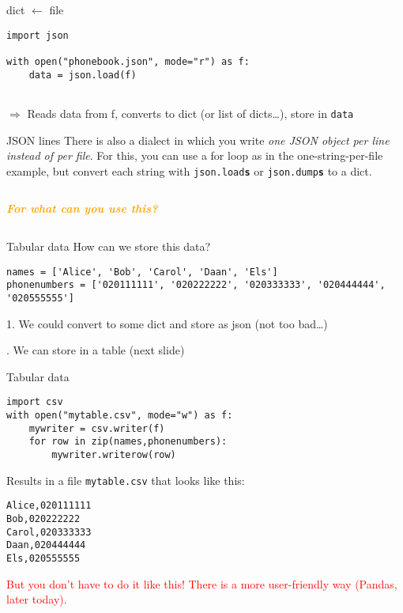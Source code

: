 \documentclass[compress]{beamer}
\newcommand{\question}[1]{
	\begin{frame}[plain]
		\begin{columns}
			\column{.3\textwidth}
			\makebox[\columnwidth]{
				\texttt{[image: mannetje.png]}}
			\column{.7\textwidth}
			\large
			\textcolor{orange}{\textbf{\emph{#1}}}
		\end{columns}
\end{frame}}
\begin{document}
\begin{frame}[fragile]{dict $\leftarrow$ file}
\begin{lstlisting}
import json

with open("phonebook.json", mode="r") as f:
	data = json.load(f)
	
\end{lstlisting}

$\Rightarrow$ Reads data from f, converts to dict (or list of dicts\ldots), store in \texttt{data}

\pause

\small
\begin{alertblock}{JSON lines}
There is also a dialect in which you write \emph{one JSON object per line instead of per file}. For this, you can use a for loop as in the one-string-per-file example, but convert each string with  \texttt{json.load\textbf{s}} or \texttt{json.dump\textbf{s}} to a dict.
\end{alertblock}


\end{frame}


\question{For what can you use this?}




\begin{frame}[fragile]{Tabular data}
How can we store this data?
\begin{lstlisting}
names = ['Alice', 'Bob', 'Carol', 'Daan', 'Els']
phonenumbers = ['020111111', '020222222', '020333333', '020444444', '020555555']
\end{lstlisting}
\pause

1. We could convert to some dict and store as json (not too bad\ldots)

. We can store in a table
(next slide)
\end{frame}

\begin{frame}[fragile]{Tabular data}
\begin{lstlisting}
import csv
with open("mytable.csv", mode="w") as f:
    mywriter = csv.writer(f)
    for row in zip(names,phonenumbers):
        mywriter.writerow(row)
\end{lstlisting}
	
Results in a file \texttt{mytable.csv} that looks like this:
\begin{lstlisting}
Alice,020111111
Bob,020222222
Carol,020333333
Daan,020444444
Els,020555555
\end{lstlisting}
\pause
\textcolor{red}{But you don't have to do it like this! There is a more user-friendly way (Pandas, later today).}
\end{frame}
\end{document}
